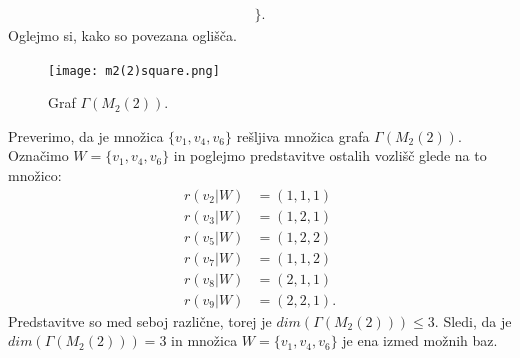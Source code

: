 \documentclass[mat1, tisk]{fmfdelo}
\begin{document}
\begin{dokaz}
\begin{align*}
    \biggr\}.
  \end{align*}
  Oglejmo si, kako so povezana oglišča.
  \begin{figure}[H]
    \centering
    \texttt{[image: m2(2)square.png]}
    \caption{Graf $\Gamma(M_2(2))$.}
  \end{figure}
  Preverimo, da je množica $\{v_1, v_4, v_6\}$ rešljiva množica grafa $\Gamma(M_2(2))$. 
  Označimo $W = \{v_1, v_4, v_6\}$ in poglejmo predstavitve ostalih vozlišč 
  glede na to množico:
    \begin{align*}
      r(v_2 | W) &= (1,1,1) \\
      r(v_3 | W) &= (1,2,1) \\
      r(v_5 | W) &= (1,2,2) \\
      r(v_7 | W) &= (1,1,2) \\
      r(v_8 | W) &= (2,1,1) \\
      r(v_9 | W) &= (2,2,1).
    \end{align*}
  Predstavitve so med seboj različne, torej je $dim(\Gamma(M_2(2))) \leq 3$. Sledi, da 
  je $dim(\Gamma(M_2(2))) = 3$ in množica $W = \{v_1, v_4, v_6\}$ je ena izmed 
  možnih baz.
\end{dokaz}
\end{document}

